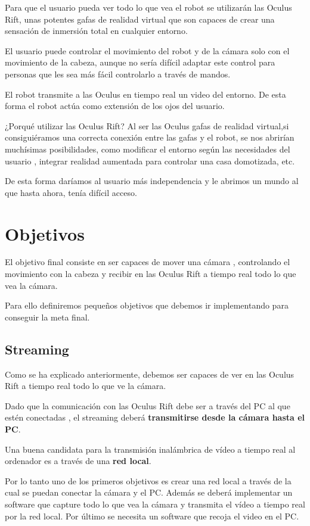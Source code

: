 \documentclass[twoside, 12pt]{epstfg}
\begin{document}
Para que el usuario pueda ver todo lo que vea el robot se utilizarán las Oculus Rift, unas potentes gafas de realidad virtual que son capaces de crear una sensación de inmersión total en cualquier entorno.

El usuario puede controlar el movimiento del robot y de la cámara solo con el movimiento de la cabeza, aunque no sería difícil adaptar este control para personas que les sea más fácil controlarlo a través de mandos.

El robot transmite a las Oculus en tiempo real un video del entorno. De esta forma el robot actúa como extensión de los ojos del usuario.

¿Porqué utilizar las Oculus Rift?  Al ser las Oculus gafas de realidad virtual,si consiguiéramos una correcta conexión entre las gafas y el robot, se nos abrirían muchísimas posibilidades, como modificar el entorno según las necesidades del usuario , integrar realidad aumentada para controlar una casa domotizada, etc.

De esta forma daríamos al usuario más independencia y le abrimos un mundo al que hasta ahora, tenía difícil acceso.


\section{Objetivos}
El objetivo final consiste en ser capaces de mover una cámara , controlando el movimiento con la cabeza y recibir en las Oculus Rift a tiempo real todo lo que vea la cámara.

Para ello definiremos pequeños objetivos que debemos ir implementando para conseguir la meta final.

\subsection{Streaming}
Como se ha explicado anteriormente, debemos ser capaces de ver en las Oculus Rift a tiempo real todo lo que ve la cámara.

Dado que la comunicación con las Oculus Rift debe ser a través del PC al que estén conectadas , el streaming deberá \textbf{transmitirse desde la cámara hasta el PC}.

Una buena candidata para la transmisión inalámbrica de vídeo a tiempo real al ordenador es a través de una \textbf{red local}.

Por lo tanto uno de los primeros objetivos es crear una red local a través de la cual se puedan conectar  la cámara y el PC. Además se deberá implementar un software que capture todo lo que vea la cámara y transmita el vídeo a tiempo real por la red local. Por último se necesita un software que recoja el video en el PC.
\end{document}
